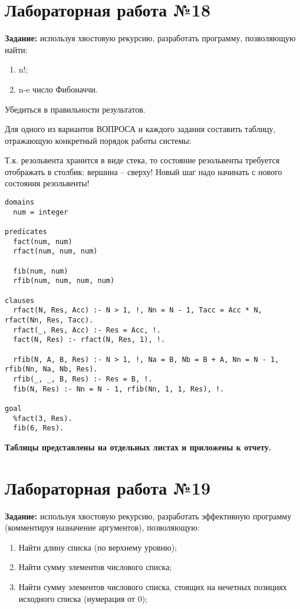 \chapter{Лабораторная работа №18}

\textbf{Задание:} используя хвостовую рекурсию, разработать программу, позволяющую найти:
\begin{enumerate}
    \item n!;
    \item n-e число Фибоначчи.
\end{enumerate}

Убедиться в правильности результатов.

Для одного из вариантов ВОПРОСА и каждого задания составить таблицу, отражающую конкретный порядок работы системы:

Т.к. резольвента хранится в виде стека, то состояние резольвенты требуется отображать в столбик: вершина – сверху! Новый шаг надо начинать с нового состояния резольвенты!

\begin{lstlisting}
domains
  num = integer

predicates
  fact(num, num)
  rfact(num, num, num)

  fib(num, num)
  rfib(num, num, num, num)

clauses
  rfact(N, Res, Acc) :- N > 1, !, Nn = N - 1, Tacc = Acc * N, rfact(Nn, Res, Tacc).
  rfact(_, Res, Acc) :- Res = Acc, !.
  fact(N, Res) :- rfact(N, Res, 1), !.

  rfib(N, A, B, Res) :- N > 1, !, Na = B, Nb = B + A, Nn = N - 1, rfib(Nn, Na, Nb, Res).
  rfib(_, _, B, Res) :- Res = B, !.
  fib(N, Res) :- Nn = N - 1, rfib(Nn, 1, 1, Res), !.

goal
  %fact(3, Res).
  fib(6, Res).
\end{lstlisting}

\textbf{Таблицы представлены на отдельных листах и приложены к отчету.}

\chapter{Лабораторная работа №19}

\textbf{Задание:} используя хвостовую рекурсию, разработать эффективную программу (комментируя назначение аргументов), позволяющую:
\begin{enumerate}
    \item Найти длину списка (по верхнему уровню);
    \item Найти сумму элементов числового списка;
    \item Найти сумму элементов числового списка, стоящих на нечетных позициях исходного списка (нумерация от 0);
\end{enumerate}

